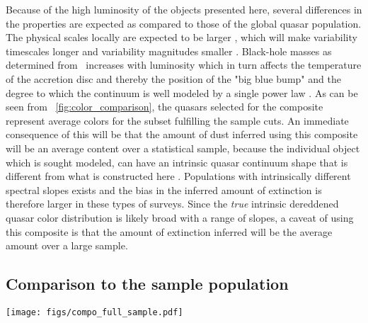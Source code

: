 \documentclass{aa}    %
\newcommand{\figref}[1]{\ref{fig:#1}}
\newcommand{\Fig}[1]{\figurename~\figref{#1}}
\newcommand{\fig}[1]{\Fig{#1}}
\newcommand{\figlabel}[1]{\label{fig:#1}}
\newcommand{\sectionname}{Sect.}
\newcommand{\Sect}[1]{\sectionname~\ref{sect:#1}}
\newcommand{\sect}[1]{\Sect{#1}}
\newcommand{\sectlabel}[1]{\label{sect:#1}}
\newcommand{\mgii}{\ion{Mg}{ii}}
\begin{document}
Because of the high luminosity of the objects presented here, several
differences in the properties are expected as compared to those of the
global quasar population. The physical scales locally are expected to
be larger \citep{Bentz2013}, which will make variability timescales
longer and variability magnitudes smaller \citep{VandenBerk2004,
  Schmidt2012}. Black-hole masses as determined from \mgii~increases
with luminosity \citep{wu2015} which in turn affects the temperature
of the accretion disc \citep{shakura1973, Pereyra2006} and thereby the
position of the "big blue bump" and the degree to which the continuum
is well modeled by a single power law \citep[see also][for a
  discussion]{Lusso2015}. As can be seen from \fig{color_comparison},
the quasars selected for the composite represent average colors for
the subset fulfilling the sample cuts. An immediate consequence of
this will be that the amount of dust inferred using this composite
will be an average content over a statistical sample, because the
individual object which is sought modeled, can have an intrinsic
quasar continuum shape that is different from what is constructed here
\citep{Richards2003, Hopkins2004}. Populations with intrinsically
different spectral slopes exists \citep{Glikman2012, Krawczyk2015} and
the bias in the inferred amount of extinction is therefore larger in
these types of surveys. Since the \textit{true} intrinsic dereddened
quasar color distribution is likely broad with a range of slopes, a
caveat of using this composite is that the amount of extinction
inferred will be the average amount over a large sample.



\subsection{Comparison to the sample population}  \sectlabel{sample_pop}


\begin{figure*}[t!]
\centering
\texttt{[image: figs/compo\_full\_sample.pdf]}
\caption[]{X-shooter weighted arithmetic mean quasar composite on a linear wavelength
scale in light brown. The positions of several prominent emission lines are
marked. Overplotted in dark green is the corresponding composite generated from
the full sample of SDSS quasars fulfilling the selection criteria and general
agreement is observed, albeit with a brighter Balmer continuum in the
SDSS-constructed composite. In purple is shown the results from fitting both a
pure and a broken power law to the regions specified in \sect{results} and they
are observed to be indistinguishable.}
\figlabel{composite}
\end{figure*}
\end{document}
